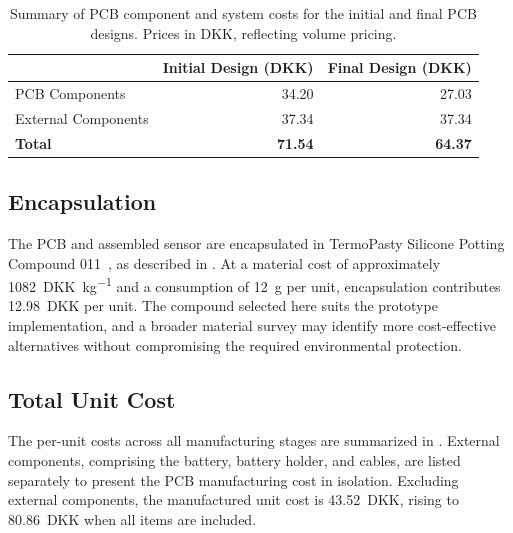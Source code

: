 \begin{table}
\centering
\caption{Summary of PCB component and system costs for the initial and final
         PCB designs. Prices in DKK, reflecting volume pricing.}
\label{tab:bom_summary}
\small
\setlength{\tabcolsep}{4pt}
\begin{tabularx}{\textwidth}{@{} X r r @{}}
\toprule
 & Initial Design (DKK) & Final Design (DKK) \\
\midrule
PCB Components      & 34.20 & 27.03 \\
External Components & 37.34 & 37.34 \\
\midrule
\textbf{Total}      & \textbf{71.54} & \textbf{64.37} \\
\bottomrule
\end{tabularx}
\end{table}

\subsection{Encapsulation}
 
The PCB and assembled sensor are encapsulated in TermoPasty Silicone Potting Compound 011~\cite{termopasty_silicone_compound_011}, as described in . At a material cost of approximately \SI{1082}{DKK\per\kilo\gram} and a consumption of \SI{12}{\gram} per unit, encapsulation contributes \SI{12.98}{DKK} per unit. The compound selected here suits the prototype implementation, and a broader material survey may identify more cost-effective alternatives without compromising the required environmental protection.
 
\subsection{Total Unit Cost}
 
The per-unit costs across all manufacturing stages are summarized in . External components, comprising the battery, battery holder, and cables, are listed separately to present the PCB manufacturing cost in isolation. Excluding external components, the manufactured unit cost is \SI{43.52}{DKK}, rising to \SI{80.86}{DKK} when all items are included.
 

